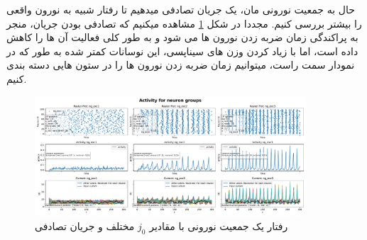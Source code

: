 \documentclass{report}
\begin{document}
                حال به جمعیت نورونی مان، یک جریان تصادفی میدهیم تا رفتار شبیه به نورون واقعی را بیشتر بررسی کنیم. مجددا در شکل
                \ref{fig:part2-one-ng-full-synapse-diff-j-rand-curr}
                مشاهده میکنیم که تصادفی بودن جریان، منجر به پراکندگی زمان ضربه زدن نورون ها می شود و به طور کلی فعالیت آن ها را کاهش داده است، اما با زیاد کردن وزن های سیناپسی، این نوسانات کمتر شده به طور که در نمودار سمت راست، میتوانیم زمان ضربه زدن نورون ها را در ستون هایی دسته بندی کنیم.
                \begin{figure}[!ht]
                    \centering
                    \includegraphics[width=0.9\textwidth]{plots/part2-one-ng-full-synapse-diff-j-rand-curr.pdf} 
                    \caption{رفتار یک جمعیت نورونی با مقادیر $j_0$ مختلف و جریان تصادفی}
                    \label{fig:part2-one-ng-full-synapse-diff-j-rand-curr}
                \end{figure}
\end{document}
